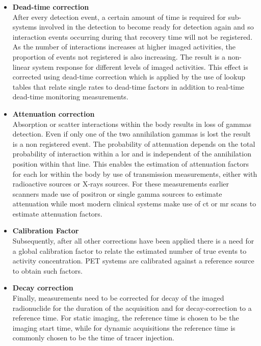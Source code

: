 \begin{itemize}
\item\textbf{Dead-time correction}\\
After every detection event, a certain amount of time is required for sub-systems involved in the detection to become ready for detection again and so interaction events occurring during that recovery time will not be registered. As the number of interactions increases at higher imaged activities, the proportion of events not registered is also increasing. The result is a non-linear system response for different levels of imaged activities. This effect is corrected using dead-time correction which is applied by the use of lookup tables that relate single rates to dead-time factors in addition to real-time dead-time monitoring measurements.
\item\textbf{Attenuation correction}\\
Absorption or scatter interactions within the body results in loss of gammas detection. Even if only one of the two annihilation gammas is lost the result is a non registered event. The probability of attenuation depends on the total probability of interaction within a \gls{lor} and is independent of the annihilation position within that line. This enables the estimation of attenuation factors for each \gls{lor} within the body by use of transmission measurements, either with radioactive sources or X-rays sources. For these measurements earlier scanners made use of positron or single gamma sources to estimate attenuation while most modern clinical systems make use of \gls{ct} or \gls{mr} scans to estimate attenuation factors. 
\item\textbf{Calibration Factor}\\
Subsequently, after all other corrections have been applied there is a need for a global calibration factor to relate the estimated number of true events to activity concentration. 
PET systems are calibrated against a reference source to obtain such factors. 
\item\textbf{Decay correction}\\
Finally, measurements need to be corrected for decay of the imaged radionuclide for the duration of the acquisition and for decay-correction to a reference time. 
For static imaging, the reference time is chosen to be the imaging start time, while for dynamic acquisitions the reference time is commonly chosen to be the time of tracer injection. 
\end{itemize}


